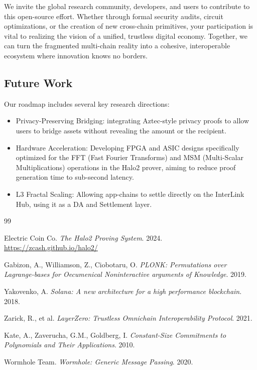 \documentclass[11pt,a4paper]{article}
\begin{document}
We invite the global research community, developers, and users to contribute to this open-source effort. Whether through formal security audits, circuit optimizations, or the creation of new cross-chain primitives, your participation is vital to realizing the vision of a unified, trustless digital economy. Together, we can turn the fragmented multi-chain reality into a cohesive, interoperable ecosystem where innovation knows no borders.

\subsection{Future Work}
Our roadmap includes several key research directions:
\begin{itemize}
    \item Privacy-Preserving Bridging: integrating Aztec-style privacy proofs to allow users to bridge assets without revealing the amount or the recipient.
    \item Hardware Acceleration: Developing FPGA and ASIC designs specifically optimized for the FFT (Fast Fourier Transforms) and MSM (Multi-Scalar Multiplications) operations in the Halo2 prover, aiming to reduce proof generation time to sub-second latency.
    \item L3 Fractal Scaling: Allowing app-chains to settle directly on the InterLink Hub, using it as a DA and Settlement layer.
\end{itemize}

\newpage

\begin{thebibliography}{99}

Electric Coin Co. \textit{The Halo2 Proving System}. 2024. \url{https://zcash.github.io/halo2/}

Gabizon, A., Williamson, Z., Ciobotaru, O. \textit{PLONK: Permutations over Lagrange-bases for Oecumenical Noninteractive arguments of Knowledge}. 2019.

Yakovenko, A. \textit{Solana: A new architecture for a high performance blockchain}. 2018.

Zarick, R., et al. \textit{LayerZero: Trustless Omnichain Interoperability Protocol}. 2021.

Kate, A., Zaverucha, G.M., Goldberg, I. \textit{Constant-Size Commitments to Polynomials and Their Applications}. 2010.

Wormhole Team. \textit{Wormhole: Generic Message Passing}. 2020.

\end{thebibliography}
\end{document}
